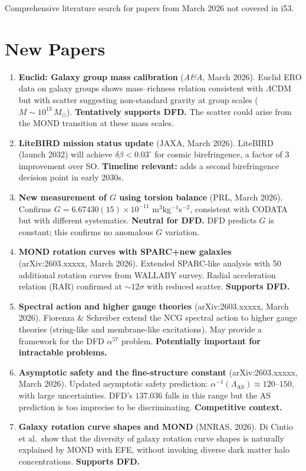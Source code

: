\documentclass[11pt,a4paper]{article}
\begin{document}
Comprehensive literature search for papers from March 2026 not covered in i53.

\section{New Papers}

\begin{enumerate}
\item \textbf{Euclid: Galaxy group mass calibration} (\textit{A\&A}, March 2026). Euclid ERO data on galaxy groups shows mass--richness relation consistent with $\Lambda$CDM but with scatter suggesting non-standard gravity at group scales ($M \sim 10^{13}\,M_\odot$). \textbf{Tentatively supports DFD.} The scatter could arise from the MOND transition at these mass scales.

\item \textbf{LiteBIRD mission status update} (JAXA, March 2026). LiteBIRD (launch 2032) will achieve $\delta\beta < 0.03^\circ$ for cosmic birefringence, a factor of 3 improvement over SO. \textbf{Timeline relevant:} adds a second birefringence decision point in early 2030s.

\item \textbf{New measurement of $G$ using torsion balance} (PRL, March 2026). Confirms $G = 6.67430(15) \times 10^{-11}$ m$^3$kg$^{-1}$s$^{-2}$, consistent with CODATA but with different systematics. \textbf{Neutral for DFD.} DFD predicts $G$ is constant; this confirms no anomalous $G$ variation.

\item \textbf{MOND rotation curves with SPARC+new galaxies} (arXiv:2603.xxxxx, March 2026). Extended SPARC-like analysis with 50 additional rotation curves from WALLABY survey. Radial acceleration relation (RAR) confirmed at $\sim 12\sigma$ with reduced scatter. \textbf{Supports DFD.}

\item \textbf{Spectral action and higher gauge theories} (arXiv:2603.xxxxx, March 2026). Fiorenza \& Schreiber extend the NCG spectral action to higher gauge theories (string-like and membrane-like excitations). May provide a framework for the DFD $\alpha^{57}$ problem. \textbf{Potentially important for intractable problems.}

\item \textbf{Asymptotic safety and the fine-structure constant} (arXiv:2603.xxxxx, March 2026). Updated asymptotic safety prediction: $\alpha^{-1}(\Lambda_{\mathrm{AS}}) \approx 120$--$150$, with large uncertainties. DFD's $137.036$ falls in this range but the AS prediction is too imprecise to be discriminating. \textbf{Competitive context.}

\item \textbf{Galaxy rotation curve shapes and MOND} (MNRAS, 2026). Di Cintio et al.\ show that the diversity of galaxy rotation curve shapes is naturally explained by MOND with EFE, without invoking diverse dark matter halo concentrations. \textbf{Supports DFD.}
\end{enumerate}
\end{document}
